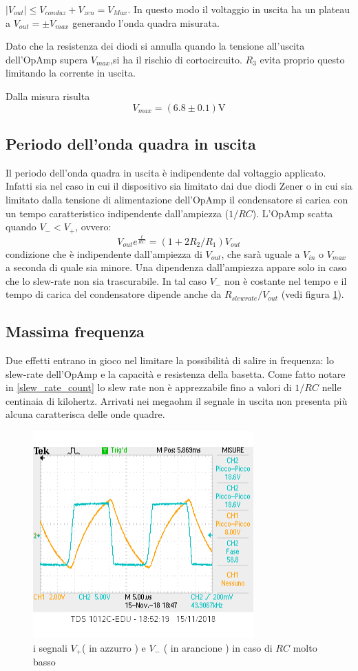 \documentclass[10pt,a4paper]{article}
\begin{document}
 $|V_{out}| \le V_{conduz} +V_{zen} = V_{Max}$. In questo modo il voltaggio in uscita ha un plateau a $V_{out} = \pm V_{max}$ generando l'onda quadra misurata.

 Dato che la resistenza dei diodi si annulla quando la tensione all'uscita dell'OpAmp supera $V_{max}$,si ha il rischio di cortocircuito. $R_3$ evita proprio questo limitando la corrente in uscita.

Dalla misura risulta \[V_{max} = ( 6.8\pm 0.1) \si \volt\]

\subsection{Periodo dell'onda quadra in uscita}
Il periodo dell'onda quadra in uscita è indipendente dal voltaggio applicato. Infatti sia nel caso in cui il dispositivo sia limitato dai due diodi Zener o in cui sia limitato dalla tensione di alimentazione dell'OpAmp il condensatore si carica con un tempo caratteristico indipendente dall'ampiezza ($1/RC$). L'OpAmp scatta quando $V_- < V_+$, ovvero:
\[V_{out} e^{\frac{t}{RC}} = (1+ 2 R_2/R_1) V_{out}\]
condizione che è indipendente dall'ampiezza di $V_{out}$, che sarà uguale a $V_{in}$ o $V_{max}$ a seconda di quale sia minore.
Una dipendenza dall'ampiezza appare solo in caso che lo slew-rate non sia trascurabile. In tal caso $V_-$ non è costante nel tempo e il tempo di carica del condensatore dipende anche da $R_{slew rate} / V_{out}$ (vedi figura \ref{fig:slew_rate}). 

\subsection{Massima frequenza}
  Due effetti entrano in gioco nel  limitare la  possibilità di salire in frequenza: lo slew-rate dell'OpAmp e la capacità e resistenza della basetta. Come fatto notare in \ref{slew_rate_count} lo slew rate non è apprezzabile fino a valori di $1/RC$ nelle centinaia di kilohertz. Arrivati nei megaohm il segnale in uscita non presenta più alcuna caratterisca delle onde quadre.

 \begin{figure}[h]
	\centering
	\includegraphics[scale=0.8]{basetta.png}
	\caption{\small i segnali $V_+$( in azzurro ) e $V_-$ ( in arancione )  in caso di $RC$ molto basso}
	\label{fig:slew_rate}
\end{figure}
\end{document}
